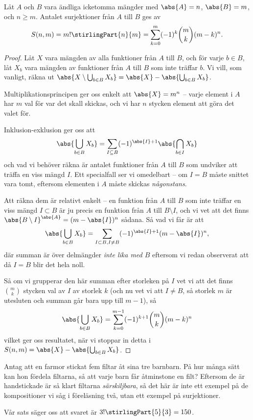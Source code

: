 \documentclass[nobib]{tufte-handout}
\begin{document}
\begin{theorem}\label{theorem_count_surjections}
  Låt $A$ och $B$ vara ändliga icketomma mängder med $\abs{A} = n$, $\abs{B} = m$, och $n \geq m$. Antalet surjektioner från $A$ till $B$ ges av
  $$S(n,m) = m!\stirlingPart{n}{m} = \sum_{k=0}^{m} (-1)^k \binom{m}{k}(m-k)^n.$$

  \begin{proof}
    Låt $X$ vara mängden av alla funktioner från $A$ till $B$, och för varje $b \in B$, låt $X_b$ vara mängden av funktioner från $A$ till $B$ som inte träffar $b$. Vi vill, som vanligt, räkna ut $\abs{X \setminus \bigcup_{b\in B} X_b} = \abs{X} - \abs{\bigcup_{b\in B} X_b}$.

    Multiplikationsprincipen ger oss enkelt att $\abs{X} = m^n$ -- varje element i $A$ har $m$ val för var det skall skickas, och vi har $n$ stycken element att göra det valet för.

    Inklusion-exklusion ger oss att
    $$\abs{\bigcup_{b\in B} X_b} = \sum_{I \subseteq B} (-1)^{\abs{I} + 1}\abs{\bigcap_{b \in I} X_b}$$
    och vad vi behöver räkna är antalet funktioner från $A$ till $B$ som undviker att träffa en viss mängd $I$. Ett specialfall ser vi omedelbart -- om $I = B$ måste snittet vara tomt, eftersom elementen i $A$ måste skickas \emph{någonstans}.

    Att räkna dem är relativt enkelt -- en funktion från $A$ till $B$ som inte träffar en viss mängd $I \subset B$ är ju precis en funktion från $A$ till $B \setminus I$, och vi vet att det finns $\abs{B \setminus I}^{\abs{A}} = (m - \abs{I})^n$ sådana. Så vad vi får är att
    $$\abs{\bigcup_{b\in B} X_b} = \sum_{I \subset B, I \neq B} (-1)^{\abs{I} + 1}(m - \abs{I})^n,$$
    där summan är över delmängder \emph{inte lika med $B$} eftersom vi redan observerat att då $I = B$ blir det hela noll.

    Så om vi grupperar den här summan efter storleken på $I$ vet vi att det finns $\binom{m}{k}$ stycken val av $I$ av storlek $k$ (och nu vet vi att $I \neq B$, så storlek $m$ är utesluten och summan går bara upp till $m-1$), så 
    $$\abs{\bigcup_{b\in B} X_b} = \sum_{k=0}^{m-1} (-1)^{k + 1}\binom{m}{k}(m - k)^n$$
    vilket ger oss resultatet, när vi stoppar in detta i $S(n,m) = \abs{X} - \abs{\bigcup_{b\in B} X_b}$.
  \end{proof}
\end{theorem}

\begin{example}
  Antag att en farmor stickat fem filtar åt sina tre barnbarn. På hur många sätt kan hon fördela filtarna, så att varje barn får åtminstone en filt? Eftersom de är handstickade är så klart filtarna \emph{särskiljbara}, så det här är inte ett exempel på de kompositioner vi såg i föreläsning två, utan ett exempel på surjektioner.

  Vår sats säger oss att svaret är $3!\stirlingPart{5}{3} = 150$.
\end{example}
\end{document}
